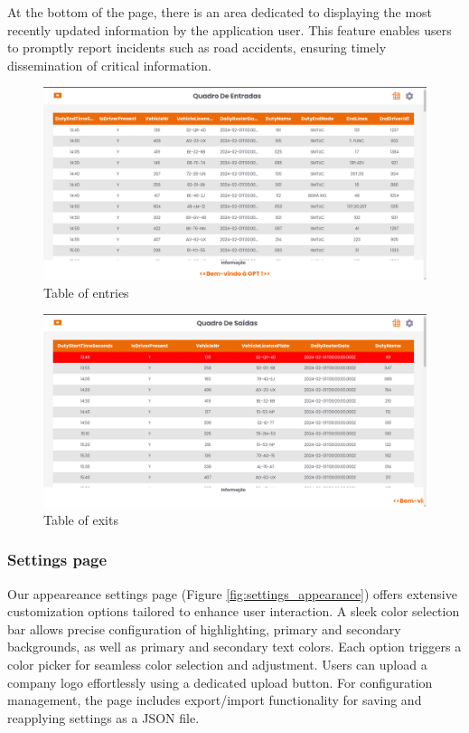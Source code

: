 \documentclass[10pt]{article}
\begin{document}
        At the bottom of the page, there is an area dedicated to displaying the most recently updated information by the application user. This feature enables users to promptly report incidents such as road accidents, ensuring timely dissemination of critical information.

        \begin{figure}[htbp]
            \centering
            \includegraphics[width=1\textwidth]{table_of_entries}
            \caption{Table of entries}
            \label{fig:table_of_entries}
        \end{figure}
        \vfill

        \begin{figure}[htbp]
            \centering
            \includegraphics[width=1\textwidth]{table_of_exits}
            \caption{Table of exits}
            \label{fig:table_of_exits}
        \end{figure}

        \subsubsection{Settings page}

        Our appeareance settings page (Figure \ref{fig:settings_appearance}) offers extensive customization options tailored to enhance user interaction. A sleek color selection bar allows precise configuration of highlighting, primary and secondary backgrounds, as well as primary and secondary text colors.
        Each option triggers a color picker for seamless color selection and adjustment.
        Users can upload a company logo effortlessly using a dedicated upload button. For configuration management, the page includes export/import functionality for saving and reapplying settings as a JSON file.
\end{document}
